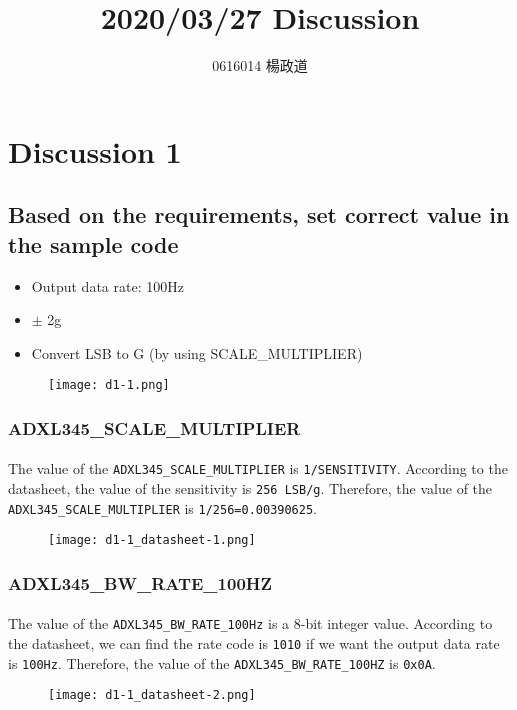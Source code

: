 \title{2020/03/27 Discussion}
\author{0616014 楊政道}
\maketitle
\thispagestyle{fancy}
\section{Discussion 1}
\subsection{Based on the requirements, set correct value in the sample code}
\begin{itemize}
    \item Output data rate: 100Hz
    \item $\pm$ 2g
    \item Convert LSB to G (by using SCALE\_MULTIPLIER)
\end{itemize}
\begin{figure}[!h]
    \begin{center} 
        \texttt{[image: d1-1.png]} 
    \end{center} 
\end{figure} 
\subsubsection{ADXL345\_SCALE\_MULTIPLIER}
\paragraph{}
The value of the \texttt{ADXL345\_SCALE\_MULTIPLIER} is \texttt{1/SENSITIVITY}. According to the datasheet, the value of the sensitivity is \texttt{256 LSB/g}. Therefore, the value of the \texttt{ADXL345\_SCALE\_MULTIPLIER} is \texttt{1/256=0.00390625}.
\begin{figure}[!h]
    \begin{center} 
        \texttt{[image: d1-1\_datasheet-1.png]} 
    \end{center} 
\end{figure} 
\subsubsection{ADXL345\_BW\_RATE\_100HZ}
\paragraph{}
The value of the \texttt{ADXL345\_BW\_RATE\_100Hz} is a 8-bit integer value. According to the datasheet, we can find the rate code is \texttt{1010} if we want the output data rate is \texttt{100Hz}. Therefore, the value of the \texttt{ADXL345\_BW\_RATE\_100HZ} is \texttt{0x0A}.
\begin{figure}[!h]
    \begin{center} 
        \texttt{[image: d1-1\_datasheet-2.png]}
    \end{center}
\end{figure}
\newpage

